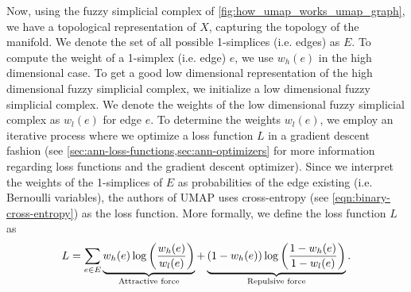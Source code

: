 Now, using the fuzzy simplicial complex of \cref{fig:how_umap_works_umap_graph}, we have a topological representation of $X$, capturing the topology of the manifold. We denote the set of all possible 1-simplices (i.e. edges) as $E$. To compute the weight of a 1-simplex (i.e. edge) $e$, we use $w_h(e)$ in the high dimensional case. To get a good low dimensional representation of the high dimensional fuzzy simplicial complex, we initialize a low dimensional fuzzy simplicial complex. We denote the weights of the low dimensional fuzzy simplicial complex as $w_l(e)$ for edge $e$. To determine the weights $w_l(e)$, we employ an iterative process where we optimize a loss function $L$ in a gradient descent fashion (see \cref{sec:ann-loss-functions,sec:ann-optimizers} for more information regarding loss functions and the gradient descent optimizer). Since we interpret the weights of the 1-simplices of $E$ as probabilities of the edge existing (i.e. Bernoulli variables), the authors of UMAP uses cross-entropy (see \cref{eqn:binary-cross-entropy}) as the loss function. More formally, we define the loss function $L$ as
\begin{align}
    L = \sumlim{e \in E}{} \undertext{w_h(e) \log \enclp{\frac{w_h(e)}{w_l(e)}}}{Attractive force} + \undertext{(1 - w_h(e)) \log \enclp{\frac{1 - w_h(e)}{1 - w_l(e)}}}{Repulsive force}.
    \label{eqn:umap-loss-function}
\end{align}


